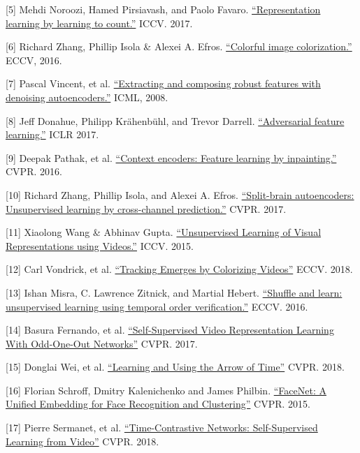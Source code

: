 {[}5{]} Mehdi Noroozi, Hamed Pirsiavash, and Paolo Favaro. \href{https://arxiv.org/abs/1708.06734}{``Representation learning by learning to count.''} ICCV. 2017.

{[}6{]} Richard Zhang, Phillip Isola \& Alexei A. Efros. \href{https://arxiv.org/abs/1603.08511}{``Colorful image colorization.''} ECCV, 2016.

{[}7{]} Pascal Vincent, et al. \href{https://www.cs.toronto.edu/~larocheh/publications/icml-2008-denoising-autoencoders.pdf}{``Extracting and composing robust features with denoising autoencoders.''} ICML, 2008.

{[}8{]} Jeff Donahue, Philipp Krähenbühl, and Trevor Darrell. \href{https://arxiv.org/abs/1605.09782}{``Adversarial feature learning.''} ICLR 2017.

{[}9{]} Deepak Pathak, et al. \href{https://arxiv.org/abs/1604.07379}{``Context encoders: Feature learning by inpainting.''} CVPR. 2016.

{[}10{]} Richard Zhang, Phillip Isola, and Alexei A. Efros. \href{https://arxiv.org/abs/1611.09842}{``Split-brain autoencoders: Unsupervised learning by cross-channel prediction.''} CVPR. 2017.

{[}11{]} Xiaolong Wang \& Abhinav Gupta. \href{https://arxiv.org/abs/1505.00687}{``Unsupervised Learning of Visual Representations using Videos.''} ICCV. 2015.

{[}12{]} Carl Vondrick, et al. \href{https://arxiv.org/pdf/1806.09594.pdf}{``Tracking Emerges by Colorizing Videos''} ECCV. 2018.

{[}13{]} Ishan Misra, C. Lawrence Zitnick, and Martial Hebert. \href{https://arxiv.org/abs/1603.08561}{``Shuffle and learn: unsupervised learning using temporal order verification.''} ECCV. 2016.

{[}14{]} Basura Fernando, et al. \href{https://arxiv.org/abs/1611.06646}{``Self-Supervised Video Representation Learning With Odd-One-Out Networks''} CVPR. 2017.

{[}15{]} Donglai Wei, et al. \href{https://www.robots.ox.ac.uk/~vgg/publications/2018/Wei18/wei18.pdf}{``Learning and Using the Arrow of Time''} CVPR. 2018.

{[}16{]} Florian Schroff, Dmitry Kalenichenko and James Philbin. \href{https://arxiv.org/abs/1503.03832}{``FaceNet: A Unified Embedding for Face Recognition and Clustering''} CVPR. 2015.

{[}17{]} Pierre Sermanet, et al. \href{https://arxiv.org/abs/1704.06888}{``Time-Contrastive Networks: Self-Supervised Learning from Video''} CVPR. 2018.

